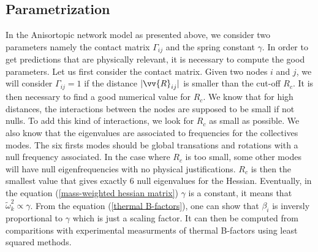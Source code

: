 \subsection{Parametrization}
In the Anisortopic network model as presented above, we consider two parameters namely the contact matrix $\Gamma_{ij}$ and the spring constant $\gamma$. In order to get predictions that are physically relevant, it is necessary to compute the good parameters. Let us first consider the contact matrix. Given two nodes $i$ and $j$, we will consider $\Gamma_{ij} = 1$ if the distance $\vert\vv{R}_{ij}\vert$ is smaller than the cut-off $R_c$. It is then necessary to find a good numerical value for $R_c$. We know that for high distances, the interactions between the nodes are supposed to be small if not nulls. To add this kind of interactions, we look for $R_c$ as small as possible. We also know that the eigenvalues are associated to frequencies for the collectives modes. The six firsts modes should be global transations and rotations with a null frequency associated. In the case where $R_c$ is too small, some other modes will have null eigenfrequencies with no physical justifications. $R_c$ is then the smallest value that gives exactly $6$ null eigenvalues for the Hessian. Eventually, in the equation (\ref{mass-weighted hessian matrix}) $\gamma$ is a constant, it means that $\tilde{\omega}_k^2 \propto \gamma$. From the equation (\ref{thermal B-factors}), one can show that $\beta_i$ is inversly proportional to $\gamma$ which is just a scaling factor. It can then be computed from comparitions with experimental measurments of thermal B-factors using least squared methods.

